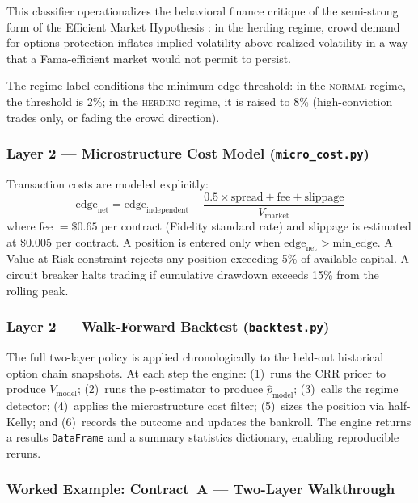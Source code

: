 \documentclass[12pt, letterpaper]{article}
\begin{document}
This classifier operationalizes the behavioral finance critique of the
semi-strong form of the Efficient Market Hypothesis \citep{Fama1970}:
in the herding regime, crowd demand for options protection inflates
implied volatility above realized volatility in a way that a
Fama-efficient market would not permit to persist.

The regime label conditions the minimum edge threshold: in the
\textsc{normal} regime, the threshold is 2\%; in the
\textsc{herding} regime, it is raised to 8\% (high-conviction
trades only, or fading the crowd direction).

\subsubsection{Layer 2 --- Microstructure Cost Model
(\texttt{micro\_cost.py})}

Transaction costs are modeled explicitly:
\begin{equation}
  \text{edge}_{\text{net}} = \text{edge}_{\text{independent}}
  - \frac{0.5 \times \text{spread} + \text{fee} +
    \text{slippage}}{V_{\text{market}}}
  \label{eq:edge_net}
\end{equation}
where fee $= \$0.65$ per contract (Fidelity standard rate) and
slippage is estimated at \$0.005 per contract. A position is
entered only when $\text{edge}_{\text{net}} > \text{min\_edge}$.
A Value-at-Risk constraint rejects any position exceeding 5\% of
available capital. A circuit breaker halts trading if cumulative
drawdown exceeds 15\% from the rolling peak.

\subsubsection{Layer 2 --- Walk-Forward Backtest
(\texttt{backtest.py})}

The full two-layer policy is applied chronologically to the
held-out historical option chain snapshots. At each step the
engine: (1)~runs the CRR pricer to produce $V_{\text{model}}$;
(2)~runs the p-estimator to produce $\hat{p}_{\text{model}}$;
(3)~calls the regime detector; (4)~applies the microstructure
cost filter; (5)~sizes the position via half-Kelly; and
(6)~records the outcome and updates the bankroll. The engine
returns a results \texttt{DataFrame} and a summary statistics
dictionary, enabling reproducible reruns.

\subsubsection{Worked Example: Contract~A --- Two-Layer Walkthrough}
\label{sec:worked_example}
\end{document}
